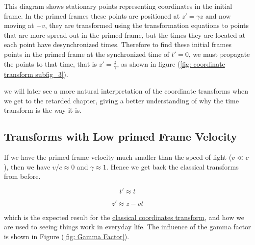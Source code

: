 This diagram shows stationary points representing coordinates in the initial frame.
In the primed frames these points are positioned at ${z{'}} = {\gamma} {z}$ and now moving at $-{v}$, they are transformed using the transformation equations to points that are more spread out in the primed frame, but the times they are located at each point have desynchronized times.
Therefore to find these initial frames points in the primed frame at the synchronized time of ${t{'}} = 0$, we must propagate the points to that time, that is ${z{'}} = \frac{{z}}{{\gamma}}$, as shown in figure (\ref{fig: coordinate transform subfig_3}).

we will later see a more natural interpretation of the coordinate transforms when we get to the retarded chapter, giving a better understanding of why the time transform is the way it is.

\subsection{Transforms with Low primed Frame Velocity} \label{subsect: Transforms with Low Primed Frame Velocity}

If we have the primed frame velocity much smaller than the speed of light ($v \ll c$), then we have ${v}/{c}\approx 0$ and $\gamma \approx 1$.
Hence we get back the classical transforms from before.

\begin{equation}
	{t{'}} \approx t
\end{equation}

\begin{equation}
	z{'} \approx {z}-{v}{t}
\end{equation}

which is the expected result for the \hyperlink{def-galilean-transform}{classical coordinates transform}, and how we are used to seeing things work in everyday life.
The influence of the gamma factor is shown in Figure (\ref{fig: Gamma Factor}).

